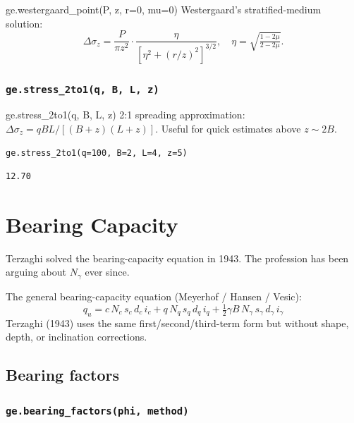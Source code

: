 \documentclass[11pt,a4paper,openany]{book}
\begin{document}
\begin{funcbox}{ge.westergaard\_point(P, z, r=0, mu=0)}
Westergaard's stratified-medium solution:
\[
\Delta\sigma_z = \frac{P}{\pi z^2}\cdot
\frac{\eta}{[\eta^2 + (r/z)^2]^{3/2}},\quad
\eta = \sqrt{\tfrac{1 - 2\mu}{2 - 2\mu}}.
\]
\end{funcbox}

\subsection{\texttt{ge.stress\_2to1(q, B, L, z)}}

\begin{funcbox}{ge.stress\_2to1(q, B, L, z)}
2:1 spreading approximation:
$\Delta\sigma_z = qBL/[(B+z)(L+z)]$.
Useful for quick estimates above $z \sim 2B$.
\end{funcbox}

\begin{lstlisting}
ge.stress_2to1(q=100, B=2, L=4, z=5)
\end{lstlisting}
\begin{lstlisting}[style=output]
12.70
\end{lstlisting}

\chapter{Bearing Capacity}\label{ch:bearing}

\epigraph{Terzaghi solved the bearing-capacity equation in 1943.
The profession has been arguing about $N_\gamma$ ever since.}{}

\noindent
The general bearing-capacity equation (Meyerhof / Hansen / Vesic):
\begin{equation}\label{eq:bearing}
\boxed{\;q_u = c\,N_c\,s_c\,d_c\,i_c
         + q\,N_q\,s_q\,d_q\,i_q
         + \tfrac{1}{2}\gamma B\,N_\gamma\,s_\gamma\,d_\gamma\,i_\gamma\;}
\end{equation}
Terzaghi (1943) uses the same first/second/third-term form but
without shape, depth, or inclination corrections.

\section{Bearing factors}

\subsection{\texttt{ge.bearing\_factors(phi, method)}}
\end{document}
